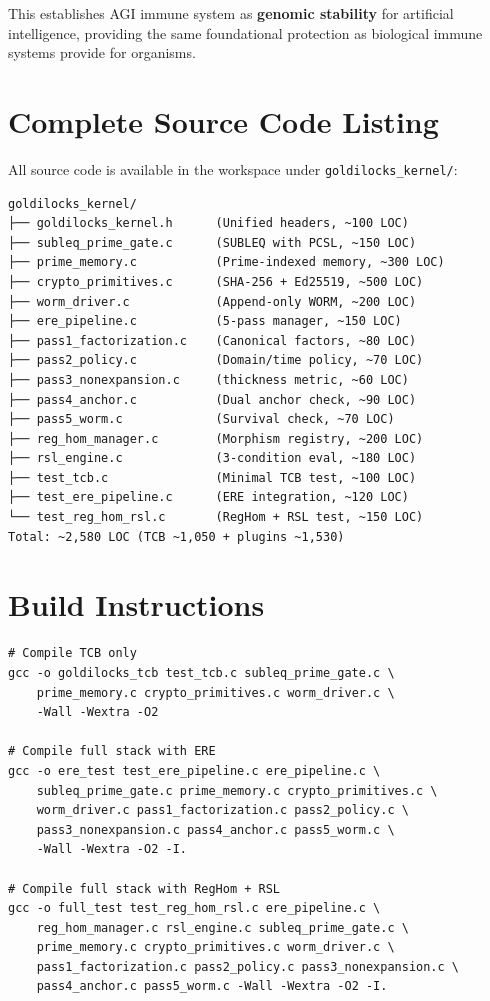 \documentclass[11pt,a4paper]{article}
\begin{document}
This establishes AGI immune system as \textbf{genomic stability} for artificial intelligence, providing the same foundational protection as biological immune systems provide for organisms.

\newpage
\appendix
\section{Complete Source Code Listing}

All source code is available in the workspace under \texttt{goldilocks\_kernel/}:

\begin{verbatim}
goldilocks_kernel/
├── goldilocks_kernel.h      (Unified headers, ~100 LOC)
├── subleq_prime_gate.c      (SUBLEQ with PCSL, ~150 LOC)
├── prime_memory.c           (Prime-indexed memory, ~300 LOC)
├── crypto_primitives.c      (SHA-256 + Ed25519, ~500 LOC)
├── worm_driver.c            (Append-only WORM, ~200 LOC)
├── ere_pipeline.c           (5-pass manager, ~150 LOC)
├── pass1_factorization.c    (Canonical factors, ~80 LOC)
├── pass2_policy.c           (Domain/time policy, ~70 LOC)
├── pass3_nonexpansion.c     (thickness metric, ~60 LOC)
├── pass4_anchor.c           (Dual anchor check, ~90 LOC)
├── pass5_worm.c             (Survival check, ~70 LOC)
├── reg_hom_manager.c        (Morphism registry, ~200 LOC)
├── rsl_engine.c             (3-condition eval, ~180 LOC)
├── test_tcb.c               (Minimal TCB test, ~100 LOC)
├── test_ere_pipeline.c      (ERE integration, ~120 LOC)
└── test_reg_hom_rsl.c       (RegHom + RSL test, ~150 LOC)
Total: ~2,580 LOC (TCB ~1,050 + plugins ~1,530)
\end{verbatim}

\section{Build Instructions}

\begin{verbatim}
# Compile TCB only
gcc -o goldilocks_tcb test_tcb.c subleq_prime_gate.c \
    prime_memory.c crypto_primitives.c worm_driver.c \
    -Wall -Wextra -O2

# Compile full stack with ERE
gcc -o ere_test test_ere_pipeline.c ere_pipeline.c \
    subleq_prime_gate.c prime_memory.c crypto_primitives.c \
    worm_driver.c pass1_factorization.c pass2_policy.c \
    pass3_nonexpansion.c pass4_anchor.c pass5_worm.c \
    -Wall -Wextra -O2 -I.

# Compile full stack with RegHom + RSL
gcc -o full_test test_reg_hom_rsl.c ere_pipeline.c \
    reg_hom_manager.c rsl_engine.c subleq_prime_gate.c \
    prime_memory.c crypto_primitives.c worm_driver.c \
    pass1_factorization.c pass2_policy.c pass3_nonexpansion.c \
    pass4_anchor.c pass5_worm.c -Wall -Wextra -O2 -I.
\end{verbatim}
\end{document}
